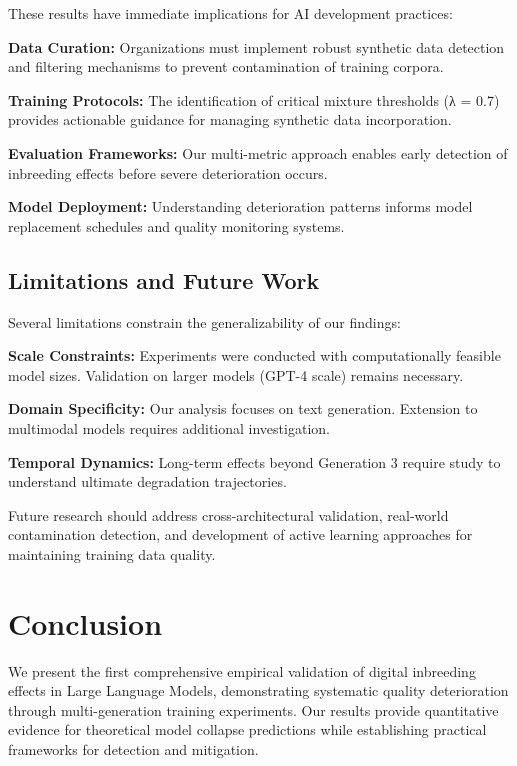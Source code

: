 \documentclass{article}
\begin{document}
These results have immediate implications for AI development practices:

\textbf{Data Curation:} Organizations must implement robust synthetic data detection and filtering mechanisms to prevent contamination of training corpora.

\textbf{Training Protocols:} The identification of critical mixture thresholds (λ = 0.7) provides actionable guidance for managing synthetic data incorporation.

\textbf{Evaluation Frameworks:} Our multi-metric approach enables early detection of inbreeding effects before severe deterioration occurs.

\textbf{Model Deployment:} Understanding deterioration patterns informs model replacement schedules and quality monitoring systems.

\subsection{Limitations and Future Work}

Several limitations constrain the generalizability of our findings:

\textbf{Scale Constraints:} Experiments were conducted with computationally feasible model sizes. Validation on larger models (GPT-4 scale) remains necessary.

\textbf{Domain Specificity:} Our analysis focuses on text generation. Extension to multimodal models requires additional investigation.

\textbf{Temporal Dynamics:} Long-term effects beyond Generation 3 require study to understand ultimate degradation trajectories.

Future research should address cross-architectural validation, real-world contamination detection, and development of active learning approaches for maintaining training data quality.

\section{Conclusion}

We present the first comprehensive empirical validation of digital inbreeding effects in Large Language Models, demonstrating systematic quality deterioration through multi-generation training experiments. Our results provide quantitative evidence for theoretical model collapse predictions while establishing practical frameworks for detection and mitigation.
\end{document}
